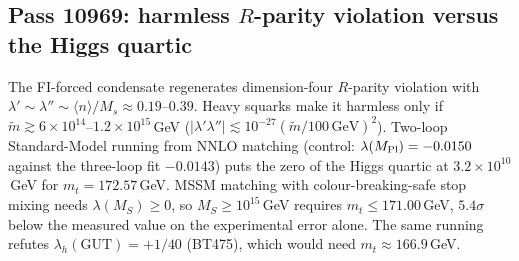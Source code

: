 \subsection{Pass 10969: harmless $R$-parity violation versus the Higgs quartic}

The FI-forced condensate regenerates dimension-four $R$-parity violation with $\lambda'\sim\lambda''
\sim\langle n\rangle/M_s\approx0.19$--$0.39$.  Heavy squarks make it harmless only if
$\tilde m\gtrsim6\times10^{14}$--$1.2\times10^{15}$\,GeV ($|\lambda'\lambda''|\lesssim10^{-27}(\tilde m/100\,
\mathrm{GeV})^2$).  Two-loop Standard-Model running from NNLO matching (control: $\lambda(M_{\rm Pl})=-0.0150$
against the three-loop fit $-0.0143$) puts the zero of the Higgs quartic at $3.2\times10^{10}$\,GeV for
$m_t=172.57$\,GeV.  MSSM matching with colour-breaking-safe stop mixing needs $\lambda(M_S)\ge0$, so
$M_S\ge10^{15}$\,GeV requires $m_t\le171.00$\,GeV, $5.4\sigma$ below the measured value on the
experimental error alone.  The same running refutes $\lambda_h(\mathrm{GUT})=+1/40$ (BT475), which would need
$m_t\approx166.9$\,GeV.

